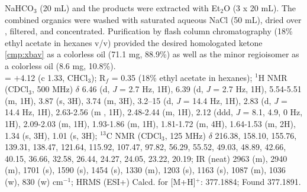 NaHCO$_3$ (20 mL) and the products were extracted with Et$_2$O (3 x 20 mL). The combined organics
were washed with saturated aqueous NaCl (50 mL), dried over , filtered, and
concentrated. Purification by flash column chromatography (18\% ethyl acetate in hexanes v/v)
provided the desired homologated ketone \ref{cmp:xbav} as a colorless oil (71.1 mg, 88.9\%) as well
 as the minor regioisomer as a colorless oil (8.6 mg, 10.8\%). \\
 \rotation = $+$4.12 (c 1.33, CHCl$_3$); R$_f$ = 0.35 (18\% ethyl acetate in hexanes); $^1$H NMR (CDCl$_3$, 500
MHz) $\delta$ 6.46 (d, \textit{J} = 2.7 Hz, 1H), 6.39 (d, \textit{J} = 2.7 Hz, 1H), 5.54-5.51 (m, 1H), 3.87 (s, 3H), 3.74
(m, 3H), 3.2–15 (d, \textit{J} = 14.4 Hz, 1H), 2.83 (d, \textit{J} = 14.4 Hz, 1H), 2.63-2.56 (m , 1H), 2.48-2.44 (m,
1H), 2.12 (ddd, \textit{J} = 8.1, 4.9, 0 Hz, 1H), 2.09-2.03 (m, 1H), 1.93-1.86 (m, 1H), 1.81-1.72 (m, 4H),
1.64-1.53 (m, 2H), 1.34 (s, 3H), 1.01 (s, 3H); $^{13}$C NMR (CDCl$_3$, 125 MHz) $\delta$ 216.38, 158.10,
155.76, 139.31, 138.47, 121.64, 115.92, 107.47, 97.82, 56.29, 55.52, 49.03, 48.89, 42.66, 40.15,
36.66, 32.58, 26.44, 24.27, 24.05, 23.22, 20.19; IR (neat) 2963 (m), 2940 (m), 1701 (s), 1590 (s),
1454 (s), 1330 (m), 1203 (s), 1163 (s), 1087 (m), 1036 (w), 830 (w) cm$^{-1}$; HRMS (ESI+) Calcd.
for  [M+H]$^+$: 377.1884; Found 377.1891.


